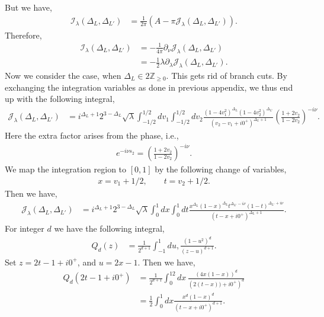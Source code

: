 \documentclass[11pt]{article}
\newcommand{\p}{\partial}
\newcommand{\lb}{\left(}
\newcommand{\rb}{\right)}
\begin{document}
But we have,
\begin{align}
    \mathcal{I}_\lambda(\Delta_L,\Delta_{L'}) &= \frac{1}{2\pi} \lb A - \pi \mathcal{J}_\lambda(\Delta_L,\Delta_{L'})\rb.
\end{align}
Therefore,
\begin{align}
    \mathcal{I}_\lambda(\Delta_L,\Delta_{L'}) &= -\frac{1}{4\pi} \p_\nu \mathcal{J}_\lambda(\Delta_L,\Delta_{L'})\\
    &= -\frac{1}{2}\lambda \p_\lambda \mathcal{J}_\lambda(\Delta_L,\Delta_{L'}) .
\end{align}
Now we consider the case, when $\Delta_L\in 2\mathbb Z_{\geq 0}$. This gets rid of branch cuts. By exchanging the integration variables as done in previous appendix, we thus end up with the following integral,
\begin{align}
    \mathcal{J}_\lambda(\Delta_L,\Delta_{L'}) &= i^{\Delta_L+1} 2^{3-\Delta_L} \sqrt \lambda \int_{-1/2}^{1/2} dv_1 \int_{-1/2}^{1/2}dv_2 \frac{(1-4v_1^2)^{\Delta_L}(1-4v_2^2)^{\Delta_{L'}}}{(v_2 - v_1 + i0^+)^{\Delta_L+1}}\lb \frac{1+2v_2}{1-2v_2}\rb^{-i\nu}.
\end{align}
Here the extra factor arises from the phase, i.e.,
\begin{align}
    e^{-i\nu s_2} = \lb\frac{1+2v_2}{1-2v_2}\rb^{-i\nu}.
\end{align}
We map the integration region to $[0,1]$ by the following change of variables,
\begin{align}
    x = v_1 + 1/2, \qquad t = v_2 + 1/2.
\end{align}
Then we have,
\begin{align}
    \mathcal{J}_\lambda(\Delta_L,\Delta_{L'}) &= i^{\Delta_L+1} 2^{3-\Delta_L} \sqrt \lambda \int_0^1 dx \int_0^1 dt \frac{x^{\Delta_L} (1-x)^{\Delta_L}t^{\Delta_{L'}- i\nu}(1-t)^{\Delta_{L'}+i\nu}}{(t-x+ i0^+)^{\Delta_L + 1}}.
\end{align}
For integer $d$ we have the following integral,
\begin{align}
    Q_d(z) &= \frac{1}{2^{d+1}}\int_{-1}^1du,\frac{(1-u^2)^d}{(z-u)^{d+1}}.
\end{align}
Set $z = 2t- 1+i0^+$, and $u = 2x-1$. Then we have, 
\begin{align}
    Q_d(2t-1+i0^+) &= \frac{1}{2^{d+1}} \int_0^12dx\, \frac{\lb  4x(1-x)\rb^d}{\lb 2(t-x)) + i0^+\rb^{d}} \\
    &= \frac{1}{2}\int_0^1dx\frac{x^d(1-x)^d}{(t-x+i0^+)^{d+1}}.
\end{align}
\end{document}
